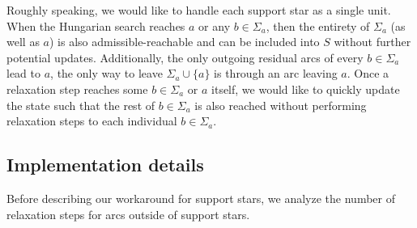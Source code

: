 \documentclass[a4paper,UKenglish]{socg-lipics-v2018}
\theoremstyle{plain}
\numberwithin{figure}{section}
\begin{document}
Roughly speaking, we would like to handle each support star as a single unit.
When the Hungarian search reaches $a$ or any $b \in \Sigma_a$, then the
entirety of $\Sigma_a$ (as well as $a$) is also admissible-reachable and can be
included into $S$ without further potential updates.
Additionally, the only outgoing residual arcs of every $b \in \Sigma_a$ lead to
$a$, the only way to leave $\Sigma_a \cup \{a\}$ is through an arc leaving $a$.
Once a relaxation step reaches some $b \in \Sigma_a$ or $a$ itself, we would
like to quickly update the state such that the rest of $b \in \Sigma_a$ is also
reached without performing relaxation steps to each individual
$b \in \Sigma_a$.

\subsection{Implementation details}

Before describing our workaround for support stars, we analyze the number of
relaxation steps for arcs outside of support stars.
\end{document}
